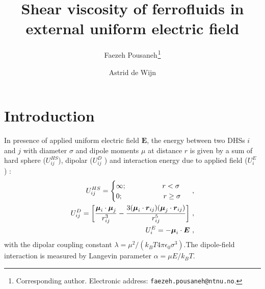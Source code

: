 \documentclass[preprint,pre,aps,superscriptaddress,a4paper]{revtex4}
\begin{document}
\title{
Shear viscosity of ferrofluids in external
uniform electric field%
}

\author{Faezeh Pousaneh$^{\scriptscriptstyle{}}$\footnote{Corresponding
    author. Electronic address: \texttt{faezeh.pousaneh@ntnu.no}.}}  
%
%
\author{Astrid de Wijn  }



\begin{abstract}

\end{abstract}
\maketitle
\maketitle



\section{Introduction}

In  presence of applied uniform electric field $ \boldsymbol E$, the energy between two DHSs $i$ and $j$ with diameter $\sigma$ and dipole moments $\mu$ at distance $r$ is given by a sum of hard sphere ($U_{ij}^{HS}$), dipolar ($U_{ij}^{D}$ ) and interaction energy  due to applied field ($U_{i}^{E}$ ) :
\begin{eqnarray}
U_{ij}^{HS}= \begin{cases} 
\infty; \hspace{1.77cm}  r<    \sigma \\
  0  ; \hspace{2cm}     r \geq   \sigma
  \end{cases}
  ~,\\
U_{ij}^D= \bigg[\frac{  \boldsymbol \mu_i \cdot \boldsymbol \mu_j }{r_{ij}^3}  - \frac{3( \boldsymbol\mu_i \cdot  \boldsymbol r_{ij})( \boldsymbol\mu_j \cdot  \boldsymbol r_{ij})}{r_{ij}^5} \bigg]~,
  \\
U_i^E= -\boldsymbol \mu_i \cdot \boldsymbol E~,
\end{eqnarray} 
with the dipolar coupling constant $\lambda= {\mu^2}/({k_B T  4\pi \epsilon_0 \sigma^3})$.The dipole-field interaction is measured by Langevin parameter $\alpha= \mu E/k_BT$.
\end{document}
